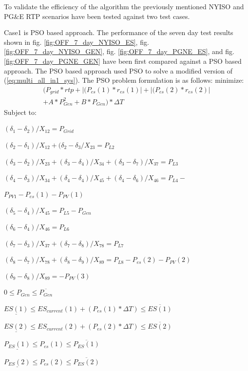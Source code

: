 To validate the efficiency of the algorithm the previously mentioned NYISO and PG\&E RTP scenarios have been tested against two test cases.

Case1 is PSO based approach. The performance of the seven day test results shown in fig. \ref{fig:OFF_7_day_NYISO_ES}, fig. \ref{fig:OFF_7_day_NYISO_GEN}, fig. \ref{fig:OFF_7_day_PGNE_ES}, and fig. \ref{fig:OFF_7_day_PGNE_GEN} have been first compared against a PSO based approach. The PSO based approach used PSO to solve a modified version of (\ref{eq:multi_all_in1_sys}). The PSO problem formulation is as follows:
minimize:
\begin{multline}
\label{eq:multi_all_in1_PSO}
    ( P_{grid}*rtp + |(P_{es}(1)*r_{es}(1)| + |(P_{es}(2)*r_{es}(2)| \\ + A*P_{Gen}^2 + B*P_{Gen} )*\Delta T
\end{multline}
Subject to:

$(\delta_1 - \delta_2)/X_{12} = P_{Grid}$

$(\delta_2 - \delta_1)/X_{12}+ (\delta_2 - \delta_3/X_{23} = P_{L2}$

$(\delta_3 - \delta_2)/X_{23}+(\delta_3 - \delta_4)/X_{34}+(\delta_3 - \delta_7)/X_{37} = P_{L3}$

$(\delta_4 - \delta_3)/X_{34}+(\delta_4 - \delta_4)/X_{45}+(\delta_4 - \delta_6)/X_{46}=P_{L4} -$

$P_{PV1} - P_{es}(1) - P_{PV}(1)$

$(\delta_5 - \delta_4)/X_{45} = P_{L5}-P_{Gen}$

$(\delta_6 - \delta_4)/X_{46} = P_{L6}$

$(\delta_7 - \delta_3)/X_{37} + (\delta_7 - \delta_8)/X_{78}  = P_{L7}$

$(\delta_8 - \delta_7)/X_{78} + (\delta_8 - \delta_9)/X_{89}  = P_{L8} - P_{es}(2) - P_{PV}(2)$

$(\delta_9 - \delta_8)/X_{89} = -P_{PV}(3)$

$0 \leq P_{Gen} \leq \overline{P_{Gen}}$

$\underline{ES(1)} \leq ES_{current}(1)+(P_{es}(1)*\Delta T) \leq \overline{ES(1)}$

$\underline{ES(2)} \leq ES_{current}(2)+(P_{es}(2)*\Delta T) \leq \overline{ES(2)}$

$\underline{P_{ES}(1)} \leq P_{es}(1) \leq \overline{P_{ES}(1)}$

$\underline{P_{ES}(2)} \leq P_{es}(2) \leq \overline{P_{ES}(2)}$\\


